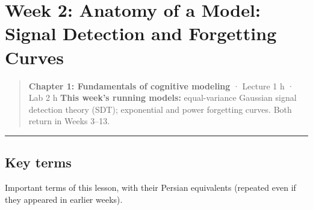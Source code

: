 \section{Week 2: Anatomy of a Model: Signal Detection and Forgetting
Curves}

\begin{quote}
\textbf{Chapter 1: Fundamentals of cognitive modeling} · Lecture 1 h ·
Lab 2 h \textbf{This week's running models:} equal-variance Gaussian
signal detection theory (SDT); exponential and power forgetting curves.
Both return in Weeks 3--13.
\end{quote}

\begin{center}\rule{0.5\linewidth}{0.5pt}\end{center}

\subsection{Key terms}

Important terms of this lesson, with their Persian equivalents (repeated
even if they appeared in earlier weeks).

